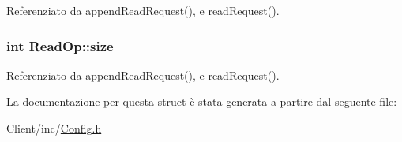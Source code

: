 Referenziato da append\+Read\+Request(), e read\+Request().

\hypertarget{structReadOp_a4ed8bd364b1b3378cc6f4faf750da527}{
\subsubsection[{size}]{\setlength{\rightskip}{0pt plus 5cm}int Read\+Op\+::size}}\label{structReadOp_a4ed8bd364b1b3378cc6f4faf750da527}


Referenziato da append\+Read\+Request(), e read\+Request().



La documentazione per questa struct è stata generata a partire dal seguente file\+:\begin{DoxyCompactItemize}
\item 
Client/inc/\hyperlink{Client_2inc_2Config_8h}{Config.\+h}\end{DoxyCompactItemize}
